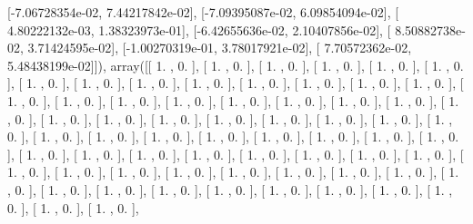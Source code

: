 \documentclass{article}
\begin{document}
       [-7.06728354e-02,  7.44217842e-02],
       [-7.09395087e-02,  6.09854094e-02],
       [ 4.80222132e-03,  1.38323973e-01],
       [-6.42655636e-02,  2.10407856e-02],
       [ 8.50882738e-02,  3.71424595e-02],
       [-1.00270319e-01,  3.78017921e-02],
       [ 7.70572362e-02,  5.48438199e-02]]), array([[ 1.        ,  0.        ],
       [ 1.        ,  0.        ],
       [ 1.        ,  0.        ],
       [ 1.        ,  0.        ],
       [ 1.        ,  0.        ],
       [ 1.        ,  0.        ],
       [ 1.        ,  0.        ],
       [ 1.        ,  0.        ],
       [ 1.        ,  0.        ],
       [ 1.        ,  0.        ],
       [ 1.        ,  0.        ],
       [ 1.        ,  0.        ],
       [ 1.        ,  0.        ],
       [ 1.        ,  0.        ],
       [ 1.        ,  0.        ],
       [ 1.        ,  0.        ],
       [ 1.        ,  0.        ],
       [ 1.        ,  0.        ],
       [ 1.        ,  0.        ],
       [ 1.        ,  0.        ],
       [ 1.        ,  0.        ],
       [ 1.        ,  0.        ],
       [ 1.        ,  0.        ],
       [ 1.        ,  0.        ],
       [ 1.        ,  0.        ],
       [ 1.        ,  0.        ],
       [ 1.        ,  0.        ],
       [ 1.        ,  0.        ],
       [ 1.        ,  0.        ],
       [ 1.        ,  0.        ],
       [ 1.        ,  0.        ],
       [ 1.        ,  0.        ],
       [ 1.        ,  0.        ],
       [ 1.        ,  0.        ],
       [ 1.        ,  0.        ],
       [ 1.        ,  0.        ],
       [ 1.        ,  0.        ],
       [ 1.        ,  0.        ],
       [ 1.        ,  0.        ],
       [ 1.        ,  0.        ],
       [ 1.        ,  0.        ],
       [ 1.        ,  0.        ],
       [ 1.        ,  0.        ],
       [ 1.        ,  0.        ],
       [ 1.        ,  0.        ],
       [ 1.        ,  0.        ],
       [ 1.        ,  0.        ],
       [ 1.        ,  0.        ],
       [ 1.        ,  0.        ],
       [ 1.        ,  0.        ],
       [ 1.        ,  0.        ],
       [ 1.        ,  0.        ],
       [ 1.        ,  0.        ],
       [ 1.        ,  0.        ],
       [ 1.        ,  0.        ],
       [ 1.        ,  0.        ],
       [ 1.        ,  0.        ],
       [ 1.        ,  0.        ],
       [ 1.        ,  0.        ],
       [ 1.        ,  0.        ],
       [ 1.        ,  0.        ],
       [ 1.        ,  0.        ],
       [ 1.        ,  0.        ],
       [ 1.        ,  0.        ],
       [ 1.        ,  0.        ],
       [ 1.        ,  0.        ],
\end{document}
